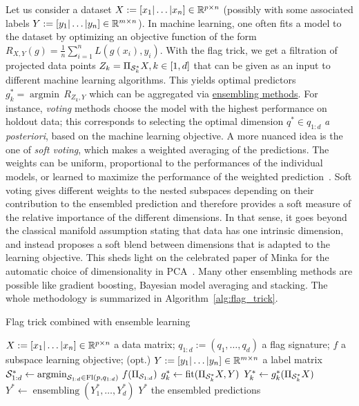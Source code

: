Let us consider a dataset $X := [x_1|\dots|x_n]\in\R^{p \times n}$ (possibly with some associated labels $Y := [y_1|\dots|y_n]\in\R^{m \times n}$). In machine learning, one often fits a model to the dataset by optimizing an objective function of the form $R_{X, Y}(g) = \frac{1}{n} \sum_{i=1}^n L(g(x_i), y_i)$.
With the flag trick, we get a filtration of projected data points $Z_k = \Pi_{\S_k^*} X, k\in[1,d]$ that can be given as an input to different machine learning algorithms. This yields optimal predictors $g_k^* = \operatorname{argmin} \, R_{Z_k, Y}$ which can be aggregated via \href{https://scikit-learn.org/stable/modules/ensemble.html}{ensembling methods}.
For instance, \textit{voting} methods choose the model with the highest performance on holdout data; this corresponds to selecting the optimal dimension $q^* \in q_{1:d}$ \textit{a posteriori}, based on the machine learning objective. A more nuanced idea is the one of \textit{soft voting}, which makes a weighted averaging of the predictions. The weights can be uniform, proportional to the performances of the individual models, or learned to maximize the performance of the weighted prediction~\citep{perrone_when_1992}. Soft voting gives different weights to the nested subspaces depending on their contribution to the ensembled prediction and therefore provides a soft measure of the relative importance of the different dimensions. In that sense, it goes beyond the classical manifold assumption stating that data has one intrinsic dimension, and instead proposes a soft blend between dimensions that is adapted to the learning objective. This sheds light on the celebrated paper of Minka for the automatic choice of dimensionality in PCA~\citep[Section~5]{minka_automatic_2000}.
Many other ensembling methods are possible like gradient boosting, Bayesian model averaging and stacking.
The whole methodology is summarized in Algorithm~\ref{alg:flag_trick}.
\begin{algorithm}
\caption{Flag trick combined with ensemble learning}\label{alg:flag_trick}
\begin{algorithmic}
\Require $X := [x_1|\dots|x_n]\in\R^{p \times n}$ a data matrix; $q_{1:d} := (q_1, \dots, q_d)$ a flag signature; $f$ a subspace learning objective; (opt.) $Y := [y_1|\dots|y_n]\in\R^{m \times n}$ a label matrix
\State ${\S}_{1:d}^* \gets \operatorname{argmin}_{\S_{1:d} \in \Fl(p, q_{1:d})} \, f(\Pi_{\S_{1:d}})$  
	\State $g_k^* \gets \operatorname{fit}(\Pi_{\S_k^*} X, Y)$  
	\State $Y_k^* \gets g_k^*(\Pi_{\S_k^*} X)$ 
\EndFor
\State $Y^* \gets \operatorname{ensembling}({Y}_1^*, \dots, {Y}_d^*)$  
\Ensure $Y^*$ the ensembled predictions
\end{algorithmic}
\end{algorithm}

